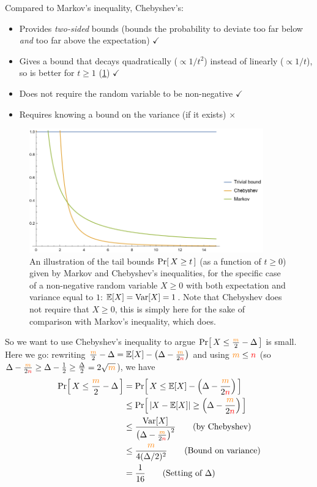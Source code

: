 \begin{framed}
\noindent Compared to Markov's inequality, Chebyshev's:
\begin{itemize}
    \item Provides \emph{two-sided} bounds (bounds the probability to deviate too far below \emph{and} too far above the expectation) \hfill $\checkmark$
    \item Gives a bound that decays quadratically ($\propto 1/t^2$) instead of linearly ($\propto 1/t$), so is better for $t\geq 1$ (\cref{fig:markov:chebyshev}) \hfill $\checkmark$
    \item Does not require the random variable to be non-negative \hfill $\checkmark$
    \item Requires knowing a bound on the variance (if it exists) \hfill$\times$
\end{itemize}
\end{framed}
\begin{figure}[h]
    \centering
    \includegraphics[width=0.9\textwidth]{figures/fig-markov-v-chebyshev.png}
    \caption{An illustration of the tail bounds $\probaOf{X\geq t}$ (as a function of $t\geq 0$) given by Markov and Chebyshev's inequalities, for the specific case of a non-negative random variable $X\geq 0$ with both expectation and variance equal to $1$: $\expect{X}=\var[X]=1$. Note that Chebyshev does not require that $X\geq 0$, this is simply here for the sake of comparison with Markov's inequality, which does.}
    \label{fig:markov:chebyshev}
\end{figure}
So we want to use Chebyshev's inequality to argue $\probaOf{X \leq \frac{\orange{m}}{2} - \Delta}$ is small. Here we go: rewriting $\frac{\orange{m}}{2} - \Delta = \expect{X} - \left(\Delta - \frac{\orange{m}}{2\ns}\right)$ and using $\textcolor{orange}{m}\leq {\textcolor{red}{n}}$ (so $\Delta - \frac{\textcolor{orange}{m}}{2{\textcolor{red}{n}}} \geq \Delta - \frac{1}{2} \geq \frac{\Delta}{2} = 2\sqrt{\textcolor{orange}{m}}$), we have
\begin{align*}
    \probaOf{X \leq \frac{\orange{m}}{2} - \Delta}
    &= \probaOf{X \leq \expect{X} - \left(\Delta - \frac{\orange{m}}{2\ns}\right)}\\
    &\leq \probaOf{\abs{X-\expect{X}} \geq \left(\Delta - \frac{\orange{m}}{2\ns}\right)}\\
    &\leq \frac{\var[X]}{\big(\Delta - \frac{\orange{m}}{2\ns}\big)^2} \tag{by Chebyshev}\\
    &\leq \frac{\orange{m}}{4(\Delta/2)^2} \tag{Bound on variance}\\
    &= \frac{1}{16} \tag{Setting of $\Delta$} 
\end{align*}
